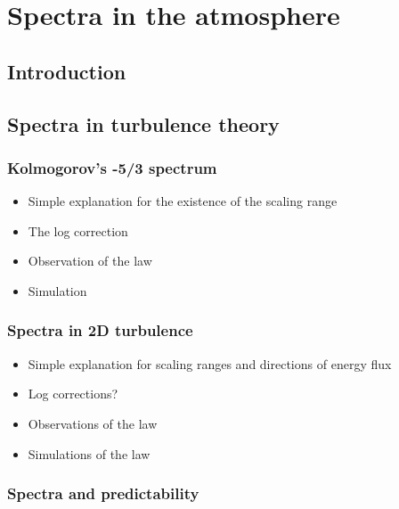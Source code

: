 \chapter{Spectra in the atmosphere}
\label{chapter:literature_review} 


\section{Introduction}

\section{Spectra in turbulence theory}

\subsection{Kolmogorov's -5/3 spectrum}

\begin{itemize}

\item{Simple explanation for the existence of the scaling range}

\item{The log correction}

\item{Observation of the law}

\item{Simulation}

\end{itemize}

\subsection{Spectra in 2D turbulence}

\begin{itemize}

\item{Simple explanation for scaling ranges and directions of energy flux}

\item{Log corrections?}

\item{Observations of the law}

\item{Simulations of the law}

\end{itemize}

\subsection{Spectra and predictability}

